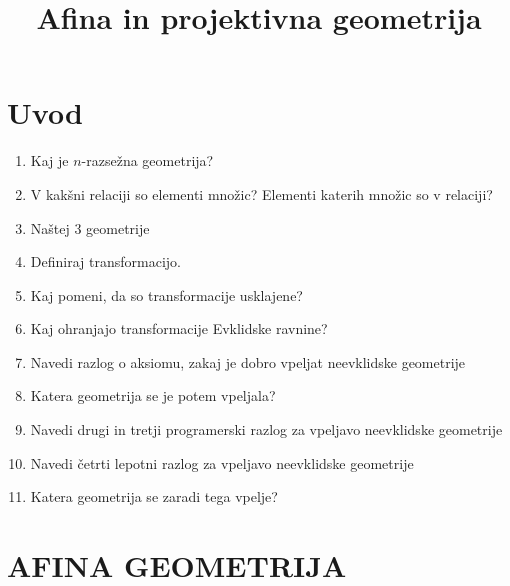 \documentclass{article}
\title{Afina in projektivna geometrija}
\begin{document}
    \maketitle

    \section{Uvod}
    \begin{enumerate}
        \item Kaj je $n$-razsežna geometrija?
        \item V kakšni relaciji so elementi množic? Elementi katerih množic so v relaciji?
        \item Naštej 3 geometrije
        \item Definiraj transformacijo. 
        \item Kaj pomeni, da so transformacije usklajene?
        \item Kaj ohranjajo transformacije Evklidske ravnine?
        \item Navedi razlog o aksiomu, zakaj je dobro vpeljat neevklidske geometrije
        \item Katera geometrija se je potem vpeljala?
        \item Navedi drugi in tretji programerski razlog za vpeljavo neevklidske geometrije
        \item Navedi četrti lepotni razlog za vpeljavo neevklidske geometrije
        \item Katera geometrija se zaradi tega vpelje?
    \end{enumerate}

    \section*{AFINA GEOMETRIJA}
\end{document}
